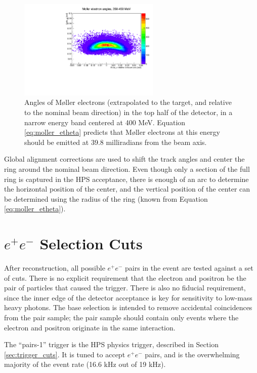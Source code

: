 \begin{figure}[ht]
\begin{center}
    \includegraphics[width=0.6\textwidth,page=2,angle=-90]{recon/figs/mollerplots}
\end{center}
    \caption{
        Angles of M{\o}ller electrons (extrapolated to the target, and relative to the nominal beam direction) in the top half of the detector, in a narrow energy band centered at 400 MeV.
        Equation \ref{eq:moller_etheta} predicts that M{\o}ller electrons at this energy should be emitted at 39.8 milliradians from the beam axis.
    }
    \label{fig:mollerangles}
\end{figure}

Global alignment corrections are used to shift the track angles and center the ring around the nominal beam direction.
Even though only a section of the full ring is captured in the HPS acceptance, there is enough of an arc to determine the horizontal position of the center, and the vertical position of the center can be determined using the radius of the ring (known from Equation \ref{eq:moller_etheta}).

\section{\texorpdfstring{$e^+e^-$}{e+e-} Selection Cuts}
\label{sec:event_selection}
After reconstruction, all possible $e^+e^-$ pairs in the event are tested against a set of cuts.
There is no explicit requirement that the electron and positron be the pair of particles that caused the trigger.
There is also no fiducial requirement, since the inner edge of the detector acceptance is key for sensitivity to low-mass heavy photons.
The base selection is intended to remove accidental coincidences from the pair sample; the pair sample should contain only events where the electron and positron originate in the same interaction.

The ``pairs-1'' trigger is the HPS physics trigger, described in Section \ref{sec:trigger_cuts}.
It is tuned to accept $e^+e^-$ pairs, and is the overwhelming majority of the event rate (16.6 kHz out of 19 kHz).

